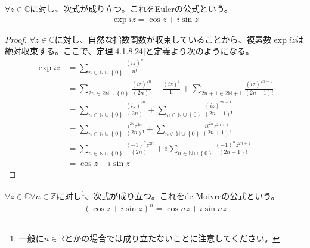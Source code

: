 \documentclass[dvipdfmx]{jsarticle}
\begin{document}
\begin{thm}[Eulerの公式]\label{4.3.1.12}
$\forall z \in \mathbb{C}$に対し、次式が成り立つ。これをEulerの公式という。
\begin{align*}
\exp{iz} = \cos z + i\sin z
\end{align*}
\end{thm}
\begin{proof}
$\forall z \in \mathbb{C}$に対し、自然な指数関数が収束していることから、複素数$\exp{iz}$は絶対収束する。ここで、定理\ref{4.1.8.24}と定義より次のようになる。
\begin{align*}
\exp{iz} &= \sum_{n \in \mathbb{N} \cup \left\{ 0 \right\}} \frac{(iz)^{n}}{n!}\\
&= \sum_{2n \in 2\mathbb{N} \cup \left\{ 0 \right\}} \frac{(iz)^{2n}}{(2n)!} + \frac{(iz)^{1}}{1!} + \sum_{2n + 1 \in 2\mathbb{N} + 1} \frac{(iz)^{2n - 1}}{(2n - 1)!}\\
&= \sum_{n \in \mathbb{N} \cup \left\{ 0 \right\}} \frac{(iz)^{2n}}{(2n)!} + \sum_{n \in \mathbb{N} \cup \left\{ 0 \right\}} \frac{(iz)^{2n + 1}}{(2n + 1)!}\\
&= \sum_{n \in \mathbb{N} \cup \left\{ 0 \right\}} \frac{i^{2n}z^{2n}}{(2n)!} + \sum_{n \in \mathbb{N} \cup \left\{ 0 \right\}} \frac{ii^{2n}z^{2n + 1}}{(2n + 1)!}\\
&= \sum_{n \in \mathbb{N} \cup \left\{ 0 \right\}} \frac{( - 1)^{n}z^{2n}}{(2n)!} + i\sum_{n \in \mathbb{N} \cup \left\{ 0 \right\}} \frac{( - 1)^{n}z^{2n + 1}}{(2n + 1)!}\\
&= \cos z + i\sin z
\end{align*}
\end{proof}
\begin{thm}[de Moivreの公式]\label{4.3.1.13}
$\forall z \in \mathbb{C}\forall n \in \mathbb{Z}$に対し\footnote{一般に$n \in \mathbb{R}$とかの場合では成り立たないことに注意してください。}、次式が成り立つ。これをde Moivreの公式という。
\begin{align*}
\left( \cos z + i\sin z \right)^{n} = \cos{nz} + i\sin{nz}
\end{align*}
\end{thm}
\end{document}
